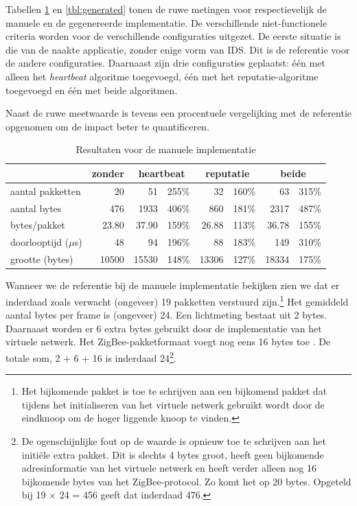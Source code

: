 Tabellen \ref{tbl:manual} en \ref{tbl:generated} tonen de ruwe metingen voor
respectievelijk de manuele en de gegenereerde implementatie. De verschillende
niet-functionele criteria worden voor de verschillende configuraties uitgezet.
De eerste situatie is die van de naakte applicatie, zonder enige vorm van IDS.
Dit is de referentie voor de andere configuraties. Daarnaast zijn drie
configuraties geplaatst: \'e\'en met alleen het \emph{heartbeat} algoritme
toegevoegd, \'e\'en met het reputatie-algoritme toegevoegd en \'e\'en met beide
algoritmen.

Naast de ruwe meetwaarde is tevens een procentuele vergelijking met de
referentie opgenomen om de impact beter te quantificeren.

\begin{table}[H]
  \centering
  \begin{tabular}{l|r|rr|rr|rr}
  \hline
      & zonder & \multicolumn{2}{c|}{heartbeat} & \multicolumn{2}{c|}{reputatie} & \multicolumn{2}{c}{beide} \\
  \hline
  \hline

aantal pakketten      &    20    &    51    & 255\% &    32    & 160\% &    63    & 315\% \\
aantal bytes          &   476    &  1933    & 406\% &   860    & 181\% &  2317    & 487\% \\
bytes/pakket          &    23.80 &    37.90 & 159\% &    26.88 & 113\% &    36.78 & 155\% \\
doorlooptijd ($\mu$s) &    48    &    94    & 196\% &    88    & 183\% &   149    & 310\% \\
grootte (bytes)       & 10500    & 15530    & 148\% & 13306    & 127\% & 18334    & 175\% \\

  \hline
  \end{tabular}
  \caption{Resultaten voor de manuele implementatie}
  \label{tbl:manual}
\end{table}

Wanneer we de referentie bij de manuele implementatie bekijken zien we dat er
inderdaad zoals verwacht (ongeveer) 19 pakketten verstuurd zijn.\footnote{Het
bijkomende pakket is toe te schrijven aan een bijkomend pakket dat tijdens het
initialiseren van het virtuele netwerk gebruikt wordt door de eindknoop om de
hoger liggende knoop te vinden.} Het gemiddeld aantal bytes per frame is
(ongeveer) 24. Een lichtmeting bestaat uit 2 bytes. Daarnaast worden er 6 extra
bytes gebruikt door de implementatie van het virtuele netwerk. Het
ZigBee-pakketformaat voegt nog eens 16 bytes toe \citep{alliance2012zigbee}. De
totale som, 2 + 6 + 16 is inderdaad 24\footnote{De ogenschijnlijke fout op de
waarde is opnieuw toe te schrijven aan het initi\"ele extra pakket. Dit is
slechts 4 bytes groot, heeft geen bijkomende adresinformatie van het virtuele
netwerk en heeft verder alleen nog 16 bijkomende bytes van het ZigBee-protocol.
Zo komt het op 20 bytes. Opgeteld bij 19 $\times$ 24 = 456 geeft dat inderdaad
476.}.

